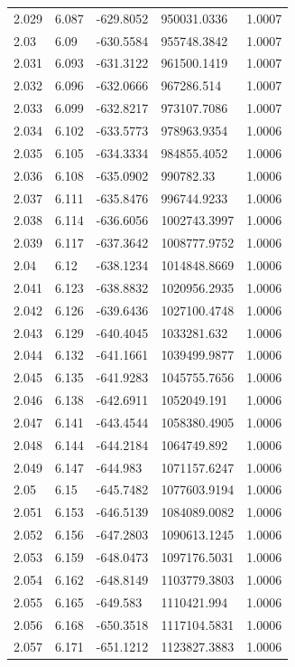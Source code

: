 \begin{tabular}{lllll}
2.029 & 6.087 & -629.8052 & 950031.0336 & 1.0007 \\
2.03 & 6.09 & -630.5584 & 955748.3842 & 1.0007 \\
2.031 & 6.093 & -631.3122 & 961500.1419 & 1.0007 \\
2.032 & 6.096 & -632.0666 & 967286.514 & 1.0007 \\
2.033 & 6.099 & -632.8217 & 973107.7086 & 1.0007 \\
2.034 & 6.102 & -633.5773 & 978963.9354 & 1.0006 \\
2.035 & 6.105 & -634.3334 & 984855.4052 & 1.0006 \\
2.036 & 6.108 & -635.0902 & 990782.33 & 1.0006 \\
2.037 & 6.111 & -635.8476 & 996744.9233 & 1.0006 \\
2.038 & 6.114 & -636.6056 & 1002743.3997 & 1.0006 \\
2.039 & 6.117 & -637.3642 & 1008777.9752 & 1.0006 \\
2.04 & 6.12 & -638.1234 & 1014848.8669 & 1.0006 \\
2.041 & 6.123 & -638.8832 & 1020956.2935 & 1.0006 \\
2.042 & 6.126 & -639.6436 & 1027100.4748 & 1.0006 \\
2.043 & 6.129 & -640.4045 & 1033281.632 & 1.0006 \\
2.044 & 6.132 & -641.1661 & 1039499.9877 & 1.0006 \\
2.045 & 6.135 & -641.9283 & 1045755.7656 & 1.0006 \\
2.046 & 6.138 & -642.6911 & 1052049.191 & 1.0006 \\
2.047 & 6.141 & -643.4544 & 1058380.4905 & 1.0006 \\
2.048 & 6.144 & -644.2184 & 1064749.892 & 1.0006 \\
2.049 & 6.147 & -644.983 & 1071157.6247 & 1.0006 \\
2.05 & 6.15 & -645.7482 & 1077603.9194 & 1.0006 \\
2.051 & 6.153 & -646.5139 & 1084089.0082 & 1.0006 \\
2.052 & 6.156 & -647.2803 & 1090613.1245 & 1.0006 \\
2.053 & 6.159 & -648.0473 & 1097176.5031 & 1.0006 \\
2.054 & 6.162 & -648.8149 & 1103779.3803 & 1.0006 \\
2.055 & 6.165 & -649.583 & 1110421.994 & 1.0006 \\
2.056 & 6.168 & -650.3518 & 1117104.5831 & 1.0006 \\
2.057 & 6.171 & -651.1212 & 1123827.3883 & 1.0006 \\

\end{tabular}
